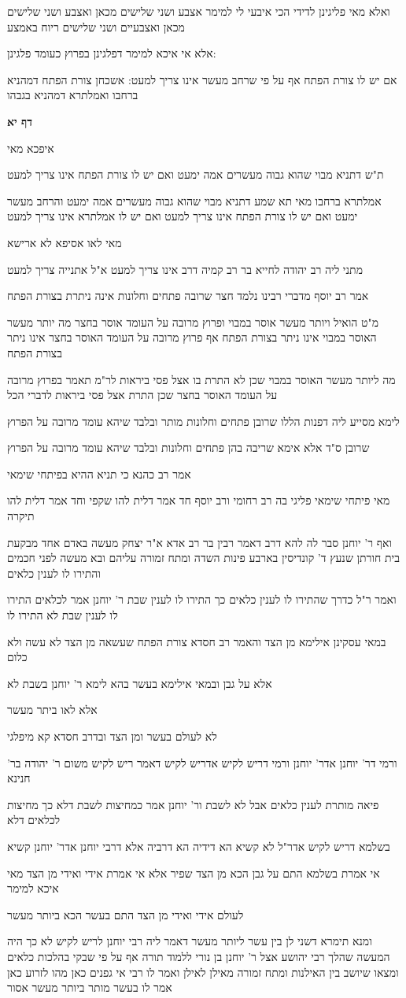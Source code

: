 \documentclass[12pt, openany]{book}
\newcommand{\sethebfont}{
\fontsize{10.5pt}{21.0pt} \selectfont
}
\newcommand{\textblock}[1]{
{\sethebfont #1\\}	
}
\newcommand{\sectname}{}
\newcommand{\newsection}[1]{
	\addcontentsline{toc}{section}{#1}
	\renewcommand{\sectname}{#1}	
	\vspace{-\baselineskip}
	\begin{center}
		\textbf{%
\fontsize{16pt}{16pt}\selectfont
			#1}
	\end{center}
	\vspace{-\baselineskip}
	\nopagebreak
}
\begin{document}
\textblock{ואלא מאי פליגינן לדידי הכי איבעי לי למימר אצבע ושני שלישים מכאן ואצבע ושני שלישים מכאן ואצבעיים ושני שלישים ריוח באמצע}
\textblock{אלא אי איכא למימר דפלגינן בפרוץ כעומד פלגינן:}
\textblock{אם יש לו צורת הפתח אף על פי שרחב מעשר אינו צריך למעט: אשכחן צורת הפתח דמהניא ברחבו ואמלתרא דמהניא בגבהו}
\newsection{דף יא}
\textblock{איפכא מאי}
\textblock{ת"ש דתניא מבוי שהוא גבוה מעשרים אמה ימעט ואם יש לו צורת הפתח אינו צריך למעט}
\textblock{אמלתרא ברחבו מאי תא שמע דתניא מבוי שהוא גבוה מעשרים אמה ימעט והרחב מעשר ימעט ואם יש לו צורת הפתח אינו צריך למעט ואם יש לו אמלתרא אינו צריך למעט}
\textblock{מאי לאו אסיפא לא ארישא}
\textblock{מתני ליה רב יהודה לחייא בר רב קמיה דרב אינו צריך למעט א"ל אתנייה צריך למעט}
\textblock{אמר רב יוסף מדברי רבינו נלמד חצר שרובה פתחים וחלונות אינה ניתרת בצורת הפתח}
\textblock{מ"ט הואיל ויותר מעשר אוסר במבוי ופרוץ מרובה על העומד אוסר בחצר מה יותר מעשר האוסר במבוי אינו ניתר בצורת הפתח אף פרוץ מרובה על העומד האוסר בחצר אינו ניתר בצורת הפתח}
\textblock{מה ליותר מעשר האוסר במבוי שכן לא התרת בו אצל פסי ביראות לר"מ תאמר בפרוץ מרובה על העומד האוסר בחצר שכן התרת אצל פסי ביראות לדברי הכל}
\textblock{לימא מסייע ליה דפנות הללו שרובן פתחים וחלונות מותר ובלבד שיהא עומד מרובה על הפרוץ}
\textblock{שרובן ס"ד אלא אימא שריבה בהן פתחים וחלונות ובלבד שיהא עומד מרובה על הפרוץ}
\textblock{אמר רב כהנא כי תניא ההיא בפיתחי שימאי}
\textblock{מאי פיתחי שימאי פליגי בה רב רחומי ורב יוסף חד אמר דלית להו שקפי וחד אמר דלית להו תיקרה}
\textblock{ואף ר' יוחנן סבר לה להא דרב דאמר רבין בר רב אדא א"ר יצחק מעשה באדם אחד מבקעת בית חורתן שנעץ ד' קונדיסין בארבע פינות השדה ומתח זמורה עליהם ובא מעשה לפני חכמים והתירו לו לענין כלאים}
\textblock{ואמר ר"ל כדרך שהתירו לו לענין כלאים כך התירו לו לענין שבת ר' יוחנן אמר לכלאים התירו לו לענין שבת לא התירו לו}
\textblock{במאי עסקינן אילימא מן הצד והאמר רב חסדא צורת הפתח שעשאה מן הצד לא עשה ולא כלום}
\textblock{אלא על גבן ובמאי אילימא בעשר בהא לימא ר' יוחנן בשבת לא}
\textblock{אלא לאו ביתר מעשר}
\textblock{לא לעולם בעשר ומן הצד ובדרב חסדא קא מיפלגי}
\textblock{ורמי דר' יוחנן אדר' יוחנן ורמי דריש לקיש אדריש לקיש דאמר ריש לקיש משום ר' יהודה בר' חנינא}
\textblock{פיאה מותרת לענין כלאים אבל לא לשבת ור' יוחנן אמר כמחיצות לשבת דלא כך מחיצות לכלאים דלא}
\textblock{בשלמא דריש לקיש אדר"ל לא קשיא הא דידיה הא דרביה אלא דרבי יוחנן אדר' יוחנן קשיא}
\textblock{אי אמרת בשלמא התם על גבן הכא מן הצד שפיר אלא אי אמרת אידי ואידי מן הצד מאי איכא למימר}
\textblock{לעולם אידי ואידי מן הצד התם בעשר הכא ביותר מעשר}
\textblock{ומנא תימרא דשני לן בין עשר ליותר מעשר דאמר ליה רבי יוחנן לריש לקיש לא כך היה המעשה שהלך רבי יהושע אצל ר' יוחנן בן נורי ללמוד תורה אף על פי שבקי בהלכות כלאים ומצאו שיושב בין האילנות ומתח זמורה מאילן לאילן ואמר לו רבי אי גפנים כאן מהו לזרוע כאן אמר לו בעשר מותר ביותר מעשר אסור}
\end{document}
